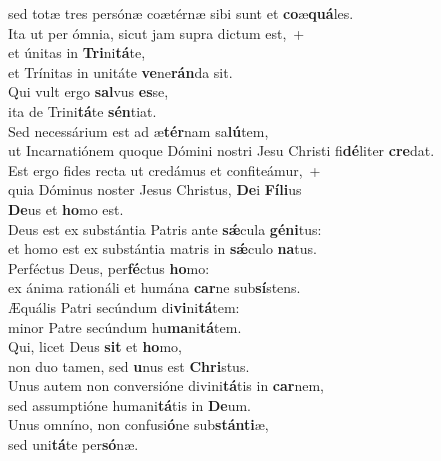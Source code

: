 \evenverse sed totæ tres persónæ coætérnæ sibi sunt et \textbf{co}æ\textbf{quá}les.\\
\oddverse Ita ut per ómnia, sicut jam supra dictum est,~+\\
\oddverse  et únitas in \textbf{Tri}ni\textbf{tá}te,~\*\\
\oddverse et Trínitas in unitáte \textbf{ve}ne\textbf{rán}da sit.\\
\evenverse Qui vult ergo \textbf{sal}vus \textbf{es}se,~\*\\
\evenverse ita de Trini\textbf{tá}te \textbf{sén}tiat.\\
\oddverse Sed necessárium est ad æ\textbf{tér}nam sa\textbf{lú}tem,~\*\\
\oddverse ut Incarnatiónem quoque Dómini nostri Jesu Christi fi\textbf{dé}liter \textbf{cre}dat.\\
\evenverse Est ergo fides recta ut credámus et confiteámur,~+\\
\evenverse  quia Dóminus noster Jesus Christus, \textbf{De}i \textbf{Fí}\textbf{li}us~\*\\
\evenverse \textbf{De}us et \textbf{ho}mo est.\\
\oddverse Deus est ex substántia Patris ante \textbf{sǽ}cula \textbf{gé}\textbf{ni}tus:~\*\\
\oddverse et homo est ex substántia matris in \textbf{sǽ}culo \textbf{na}tus.\\
\evenverse Perféctus Deus, per\textbf{fé}ctus \textbf{ho}mo:~\*\\
\evenverse ex ánima rationáli et humána \textbf{car}ne sub\textbf{sí}stens.\\
\oddverse Æquális Patri secúndum di\textbf{vi}ni\textbf{tá}tem:~\*\\
\oddverse minor Patre secúndum hu\textbf{ma}ni\textbf{tá}tem.\\
\evenverse Qui, licet Deus \textbf{sit} et \textbf{ho}mo,~\*\\
\evenverse non duo tamen, sed \textbf{u}nus est \textbf{Chri}stus.\\
\oddverse Unus autem non conversióne divini\textbf{tá}tis in \textbf{car}nem,~\*\\
\oddverse sed assumptióne humani\textbf{tá}tis in \textbf{De}um.\\
\evenverse Unus omníno, non confusi\textbf{ó}ne sub\textbf{stán}\textbf{ti}æ,~\*\\
\evenverse sed uni\textbf{tá}te per\textbf{só}næ.\\
